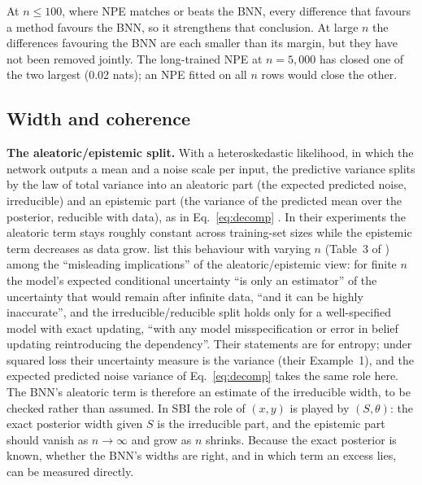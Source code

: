 \documentclass[11pt]{article}
\begin{document}
At $n\le100$, where NPE matches or beats the BNN, every difference that favours a method favours the BNN, so it
strengthens that conclusion. At large $n$ the differences favouring the BNN are each smaller than its margin, but they
have not been removed jointly. The long-trained NPE at $n=5{,}000$ has closed one of the two largest (0.02 nats); an
NPE fitted on all $n$ rows would close the other.

\subsection{Width and coherence}
\label{app:width}
\label{sec:anatomy}
\textbf{The aleatoric/epistemic split.} With a heteroskedastic likelihood, in which the network outputs a mean and a
noise scale per input, the predictive variance splits by the law of total variance into an aleatoric part (the
expected predicted noise, irreducible) and an epistemic part (the variance of the predicted mean over the posterior,
reducible with data), as in Eq.~\eqref{eq:decomp} \citep{kendall2017uncertainties}. In their experiments the aleatoric
term stays roughly constant across training-set sizes while the epistemic term decreases as data grow.
\citet{bickfordsmith2025rethinking} list this behaviour with varying $n$ (Table~3 of \citet{kendall2017uncertainties})
among the ``misleading implications'' of the aleatoric/epistemic view: for finite $n$ the model's expected conditional
uncertainty ``is only an estimator'' of the uncertainty that would remain after infinite data, ``and it can be highly
inaccurate'', and the irreducible/reducible split holds only for a well-specified model with exact updating, ``with any
model misspecification or error in belief updating reintroducing the dependency''. Their statements are for entropy;
under squared loss their uncertainty measure is the variance (their Example~1), and the expected predicted noise
variance of Eq.~\eqref{eq:decomp} takes the same role here. The BNN's aleatoric term is therefore an estimate of the
irreducible width, to be checked rather than assumed. In SBI the role
of $(x,y)$ is played by $(S,\theta)$: the exact posterior width given $S$ is the irreducible part, and the epistemic part
should vanish as $n\to\infty$ and grow as $n$ shrinks. Because the exact posterior is known, whether the BNN's widths
are right, and in which term an excess lies, can be measured directly.
\end{document}
